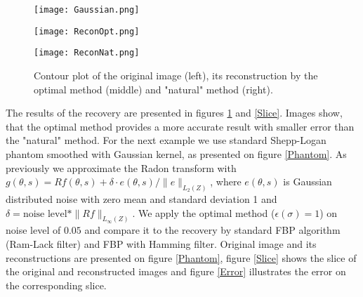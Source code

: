 \documentclass[12pt]{iopart}
\begin{document}
   \begin{figure}[H]    
        \begin{minipage}[t]{0.31\textwidth}
            \texttt{[image: Gaussian.png]}
        \end{minipage}
        \hspace{\fill}
        \begin{minipage}[t]{0.3\textwidth}
            \texttt{[image: ReconOpt.png]}
        \end{minipage}
        \hspace{\fill}
        \begin{minipage}[t]{0.3\textwidth}
            \texttt{[image: ReconNat.png]}
        \end{minipage}
        \caption{Contour plot of the original image (left), its reconstruction by the optimal method (middle) and "natural" method (right).}
        \label{Original}
    \end {figure}    
    
	
	The results of the recovery are presented in figures \ref{Original} and \ref{Slice}. Images show, that the optimal method provides a more accurate result with smaller error than the "natural" method.
	For the next example we use standard Shepp-Logan phantom smoothed with Gaussian kernel, as presented on figure \ref{Phantom}. As previously we approximate the Radon transform with $g(\theta,s) = Rf(\theta,s)+\delta\cdot e(\theta,s)/\|e\|_{L_2(Z)}$, where $e(\theta,s)$ is Gaussian distributed noise with zero mean and standard deviation 1 and $\delta=\mbox{noise level}*\|Rf\|_{L_\infty(Z)}$. We apply the optimal method ($\epsilon(\sigma) = 1$) on noise level of $0.05$ and compare it to the recovery by standard FBP algorithm (Ram-Lack filter) and FBP with Hamming filter. Original image and its reconstructions are presented on figure \ref{Phantom}, figure \ref{Slice} shows the slice of the original and reconstructed images and figure \ref{Error} illustrates the error on the corresponding slice.
	
\end{document}
